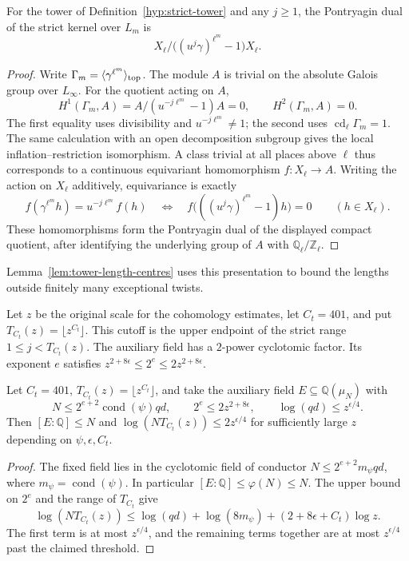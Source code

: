 \begin{lemma}\label{lem:tower-coinvariants}
For the tower of Definition~\ref{hyp:strict-tower} and any
\(j\ge1\), the Pontryagin dual of the strict kernel over \(L_m\) is
\[
 X_\ell/\bigl((u^j\gamma)^{\ell^m}-1\bigr)X_\ell .
\]
\end{lemma}
\begin{proof}
Write \(\Gamma_m=\langle\gamma^{\ell^m}\rangle_{\rm top}\).
The module \(A\) is trivial on the absolute Galois group over
\(L_\infty\). For the quotient acting on \(A\),
\[
 H^1(\Gamma_m,A)=A/(u^{-j\ell^m}-1)A=0,\qquad
 H^2(\Gamma_m,A)=0 .
\]
The first equality uses divisibility and \(u^{-j\ell^m}\ne1\);
the second uses \(\operatorname{cd}_\ell\Gamma_m=1\).
The same calculation with an open decomposition subgroup gives
the local inflation--restriction isomorphism. A class trivial
at all places above \(\ell\) thus corresponds to a continuous
equivariant homomorphism \(f:X_\ell\to A\). Writing the action
on \(X_\ell\) additively, equivariance is exactly
\[
 f(\gamma^{\ell^m}h)=u^{-j\ell^m}f(h)
 \quad\Longleftrightarrow\quad
 f\bigl(((u^j\gamma)^{\ell^m}-1)h\bigr)=0
 \qquad(h\in X_\ell).
\]
These homomorphisms form the Pontryagin dual of the displayed
compact quotient, after identifying the underlying group of
\(A\) with \(\mathbb Q_\ell/\mathbb Z_\ell\).
\end{proof}

Lemma~\ref{lem:tower-length-centres} uses this presentation to
bound the lengths outside finitely many exceptional twists.

Let \(z\) be the original scale for the cohomology estimates,
let \(C_t=401\), and put \(T_{C_t}(z)=\lfloor z^{C_t}\rfloor\).
This cutoff is the
upper endpoint of the strict range \(1\le j<T_{C_t}(z)\).
The auxiliary field has a \(2\)-power cyclotomic factor.
Its exponent \(e\) satisfies
\(z^{2+8\epsilon}\le2^e\le2z^{2+8\epsilon}\).
\begin{lemma}
Let \(C_t=401\), \(T_{C_t}(z)=\lfloor z^{C_t}\rfloor\), and take
the auxiliary field \(E\subseteq\mathbb Q(\mu_N)\) with
\[
 N\le2^{e+2}\operatorname{cond}(\psi)qd,\qquad
 2^e\le2z^{2+8\epsilon},\qquad \log(qd)\le z^{\epsilon/4}.
\]
Then \([E:\mathbb Q]\le N\) and
\(\log(NT_{C_t}(z))\le2z^{\epsilon/4}\) for sufficiently large
\(z\) depending on \(\psi,\epsilon,C_t\).
\end{lemma}
\begin{proof}
The fixed field lies in the cyclotomic field of conductor
\(N\le2^{e+2}m_\psi qd\), where \(m_\psi=\operatorname{cond}(\psi)\).
In particular \([E:\mathbb Q]\le\varphi(N)\le N\). The upper
bound on \(2^e\) and the range of \(T_{C_t}\) give
\[
 \log(NT_{C_t}(z))
 \le \log(qd)+\log(8m_\psi)+(2+8\epsilon+C_t)\log z .
\]
The first term is at most \(z^{\epsilon/4}\), and the remaining
terms together are at most \(z^{\epsilon/4}\) past the claimed threshold.
\end{proof}

